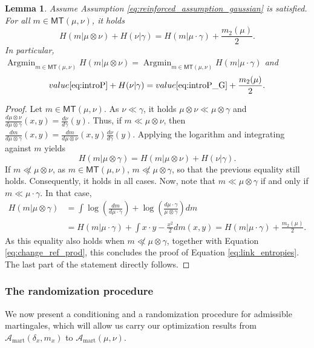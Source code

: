\documentclass[reqno, a4paper]{amsart}
\theoremstyle{plain}
\newtheorem{lemma}[theorem]{Lemma}
\theoremstyle{definition}
\theoremstyle{remark}
\numberwithin{equation}{section}
\numberwithin{theorem}{section}
\newcommand{\MT}{\mathsf{MT}}
\DeclareMathOperator{\Argmin}{Argmin}
\begin{document}
	\begin{lemma}\label{lem:relation_gaussian_analogue}
		Assume Assumption \eqref{eq:reinforced_assumption_gaussian} is satisfied.
		For all $m \in \MT(\mu,\nu)$, it holds 
		\begin{equation}\label{eq:link_entropies}
			H(m|\mu \otimes \nu)+ H(\nu|\gamma) = H(m |\mu \cdot \gamma) + \frac{m_2(\mu)}{2}.
		\end{equation}
		In particular, 
		$\Argmin_{m \in \MT(\mu,\nu)} H(m|\mu \otimes \nu) = \Argmin_{m \in \MT(\mu,\nu)} H(m|\mu \cdot \gamma)$ and $$value\eqref{eq:introP} + H(\nu|\gamma) = value\eqref{eq:introP_G} + \frac{m_2(\mu)}{2}.$$
	\end{lemma}
	
	\begin{proof}
		Let $m \in \MT(\mu,\nu)$. As $\nu \ll \gamma$, it holds $\mu \otimes \nu \ll \mu \otimes \gamma$ and $\frac{d \mu \otimes \nu}{d \mu \otimes \gamma}(x,y) = \frac{d\nu}{d\gamma}(y)$. Thus, if $m \ll \mu \otimes \nu$, then $\frac{dm}{d \mu \otimes \gamma}(x,y) = \frac{dm}{d \mu \otimes \nu}(x,y) \frac{d\nu}{d\gamma}(y)$. Applying the logarithm and integrating against $m$ yields 
		\begin{equation}\label{eq:change_ref_prod}
			H(m|\mu \otimes \gamma) = H(m|\mu \otimes \nu) + H(\nu|\gamma).  
		\end{equation}
		If $m \not\ll \mu \otimes \nu$, as $m \in \MT(\mu,\nu)$, $m \not\ll \mu \otimes \gamma$, so that the previous equality still holds. Consequently, it holds in all cases. Now, note that $m \ll \mu \otimes \gamma$ if and only if $m \ll \mu \cdot \gamma$. In that case,
		\begin{align*}
			H(m|\mu \otimes \gamma) &= \int \log \left( \frac{dm}{d \mu \cdot \gamma} \right) + \log \left( \frac{d \mu \cdot \gamma}{\mu \otimes \gamma} \right) dm \\ &= H(m|\mu \cdot \gamma) + \int x\cdot y - \frac {x^2} 2 dm(x,y) = H(m |\mu \cdot \gamma) + \frac{m_2(\mu)}{2}.
		\end{align*}
		As this equality also holds when $m \not \ll \mu \otimes \gamma$, together with Equation \eqref{eq:change_ref_prod}, this concludes the proof of Equation \eqref{eq:link_entropies}. The last part of the statement directly follows.
	\end{proof}
	
	\subsubsection{The randomization procedure}
	We now present a conditioning and a randomization procedure for admissible martingales, which will allow us carry our optimization results from $\mathcal A_{\mathrm{mart}}(\delta_x,m_x)$ to $\mathcal A_{\mathrm{mart}}(\mu,\nu).$\\
	
\end{document}
